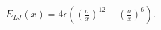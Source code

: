 $E_{LJ}(x)=4\epsilon
\left(\left(\frac{\sigma}{x}\right)^{12}-\left(\frac{\sigma}{x}\right)^{6}\right)$.

